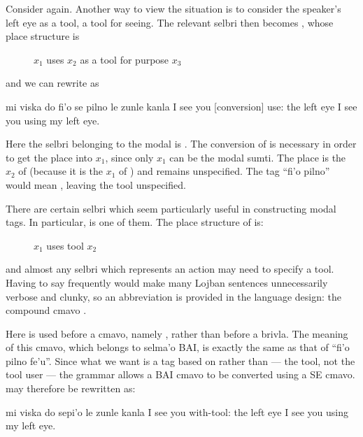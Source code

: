 Consider  again. Another way
    to view the situation is to consider the speaker's left eye as
    a tool, a tool for seeing. The relevant selbri then becomes
    , whose place structure is
\begin{description}
\item[] $x_1$ uses $x_2$ as a tool for purpose $x_3$
\end{description}

and we can rewrite  as
\begin{example}
mi viska do fi'o se pilno le zunle kanla\n
I see you  [conversion] use: the left eye\n
I see you using my left eye.
\end{example}

Here the selbri belonging to the modal is . The
    conversion of  is necessary in order to get the
     place into $x_1$, since only $x_1$ can be the modal sumti.
    The  place is the $x_2$ of  (because it
    is the $x_1$ of ) and remains unspecified. The tag ``fi'o
    pilno'' would mean , leaving the tool
    unspecified.



There are certain selbri which seem particularly useful in
    constructing modal tags. In particular,  is one of
    them. The place structure of  is:
\begin{description}
\item[] $x_1$ uses tool $x_2$
\end{description}

and almost any selbri which represents an action may need to
    specify a tool. Having to say  frequently
    would make many Lojban sentences unnecessarily verbose and
    clunky, so an abbreviation is provided in the language design:
    the compound cmavo . 

Here  is used before a cmavo, namely , rather
    than before a brivla. The meaning of this cmavo, which belongs
    to selma'o BAI, is exactly the same as that of ``fi'o pilno
    fe'u''. Since what we want is a tag based on 
    rather than  --- the tool, not the tool user --- the
    grammar allows a BAI cmavo to be converted using a SE cmavo.  may therefore be rewritten as:
\begin{example}
mi viska do sepi'o le zunle kanla\n
I see you with-tool: the left eye\n
I see you using my left eye.
\end{example}


